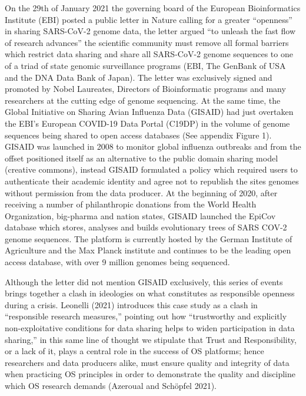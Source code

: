 \documentclass{article}
\begin{document}
On the 29th of January 2021 the governing board of the European
Bioinformatics Institute (EBI) posted a public letter in Nature calling
for a greater ``openness'' in sharing SARS-CoV-2 genome data, the letter
argued ``to unleash the fast flow of research advances'' the scientific
community must remove all formal barriers which restrict data sharing
and share all SARS-CoV-2 genome sequences to one of a triad of state
genomic surveillance programs (EBI, The GenBank of USA and the DNA Data
Bank of Japan). The letter was exclusively signed and promoted by Nobel
Laureates, Directors of Bioinformatic programs and many researchers at
the cutting edge of genome sequencing. At the same time, the Global
Initiative on Sharing Avian Influenza Data (GISAID) had just overtaken
the EBI's European COVID-19 Data Portal (C19DP) in the volume of genome
sequences being shared to open access databases (See appendix Figure 1).
GISAID was launched in 2008 to monitor global influenza outbreaks and
from the offset positioned itself as an alternative to the public domain
sharing model (creative commons), instead GISAID formulated a policy
which required users to authenticate their academic identity and agree
not to republish the sites genomes without permission from the data
producer. At the beginning of 2020, after receiving a number of
philanthropic donations from the World Health Organization, big-pharma
and nation states, GISAID launched the EpiCov database which stores,
analyses and builds evolutionary trees of SARS COV-2 genome sequences.
The platform is currently hosted by the German Institute of Agriculture
and the Max Planck institute and continues to be the leading open access
database, with over 9 million genomes being sequenced.

Although the letter did not mention GISAID exclusively, this series of
events brings together a clash in ideologies on what constitutes as
responsible openness during a crisis. Leonelli (2021) introduces this
case study as a clash in ``responsible research measures,'' pointing out
how ``trustworthy and explicitly non-exploitative conditions for data
sharing helps to widen participation in data sharing,'' in this same
line of thought we stipulate that Trust and Responsibility, or a lack of
it, plays a central role in the success of OS platforms; hence
researchers and data producers alike, must ensure quality and integrity
of data when practicing OS principles in order to demonstrate the
quality and discipline which OS research demands (Azeroual and Schöpfel
2021).
\end{document}
